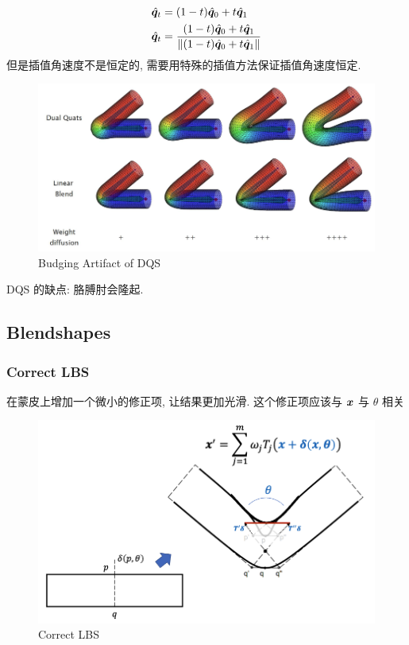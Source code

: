 \begin{align*}
    \hat{{\bm{q}}}_t &= (1-t)\hat{{\bm{q}}}_0 + t\hat{{\bm{q}}}_1\\
    \hat{{\bm{q}}}_t &= \frac{(1-t)\hat{{\bm{q}}}_0 + t\hat{{\bm{q}}}_1}{\left\lVert(1-t)\hat{{\bm{q}}}_0 + t\hat{{\bm{q}}}_1\right\rVert}
\end{align*}
但是插值角速度不是恒定的, 需要用特殊的插值方法保证插值角速度恒定.

\begin{figure}[!htb]
    \centering
    \includegraphics[width=0.618\linewidth]{pic/1057/Budging Artifact of DQS}
    \caption{Budging Artifact of DQS}
\end{figure}
DQS 的缺点: 胳膊肘会隆起.




\subsection{Blendshapes}
\subsubsection{Correct LBS}
在蒙皮上增加一个微小的修正项, 让结果更加光滑. 这个修正项应该与 ${\bm{x}}$ 与 $\theta$ 相关
\begin{figure}[!htb]
    \centering
    \includegraphics[width=0.618\linewidth]{pic/1057/Correct LBS}
    \caption{Correct LBS}
\end{figure}

